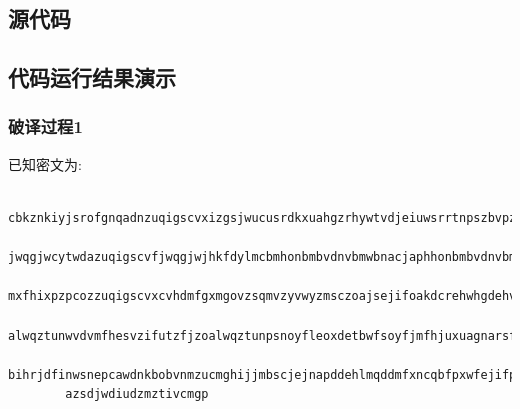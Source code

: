 \subsection{源代码}
    

\newpage
\subsection{代码运行结果演示}
    \subsubsection{破译过程1}
        已知密文为:\\

        \begin{lstlisting}
        cbkznkiyjsrofgnqadnzuqigscvxizgsjwucusrdkxuahgzrhywtvdjeiuwsrrtnpszbvpzncngztbvsrnzuqigscvf
        jwqgjwcytwdazuqigscvfjwqgjwjhkfdylmcbmhonbmbvdnvbmwbnacjaphhonbmbvdnvbmwbnaublsbdnjjneoroyf
        mxfhixpzpcozzuqigscvxcvhdmfgxmgovzsqmvzyvwyzmsczoajsejifoakdcrehwhgdehvmtnmvvmesvzifutzfjzo
        alwqztunwvdvmfhesvzifutzfjzoalwqztunpsnoyfleoxdetbwfsoyfjmfhjuxuagnarsfqydoyfjzsrzeujmfhjuu
        bihrjdfinwsnepcawdnkbobvnmzucmghijjmbscjejnapddehlmqddmfxncqbfpxwfejifpqzhikiyaiozimubwuzuf
        azsdjwdiudzmztivcmgp
        \end{lstlisting}


